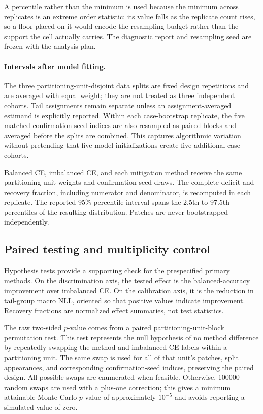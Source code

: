 \documentclass[11pt]{article}
\begin{document}
\noindent A percentile rather than the minimum is used because the minimum across replicates is an extreme order statistic: its value falls as the replicate count rises, so a floor placed on it would encode the resampling budget rather than the support the cell actually carries. The diagnostic report and resampling seed are frozen with the analysis plan.

\paragraph{Intervals after model fitting.}
The three partitioning-unit-disjoint data splits are fixed design repetitions and are averaged with equal weight; they are not treated as three independent cohorts. Tail assignments remain separate unless an assignment-averaged estimand is explicitly reported. Within each case-bootstrap replicate, the five matched confirmation-seed indices are also resampled as paired blocks and averaged before the splits are combined. This captures algorithmic variation without pretending that five model initializations create five additional case cohorts.

Balanced CE, imbalanced CE, and each mitigation method receive the same partitioning-unit weights and confirmation-seed draws. The complete deficit and recovery fraction, including numerator and denominator, is recomputed in each replicate. The reported 95\% percentile interval spans the 2.5th to 97.5th percentiles of the resulting distribution. Patches are never bootstrapped independently.

\subsection{Paired testing and multiplicity control}
\label{app:testing}
Hypothesis tests provide a supporting check for the prespecified primary methods. On the discrimination axis, the tested effect is the balanced-accuracy improvement over imbalanced CE. On the calibration axis, it is the reduction in tail-group macro NLL, oriented so that positive values indicate improvement. Recovery fractions are normalized effect summaries, not test statistics.

The raw two-sided $p$-value comes from a paired partitioning-unit-block permutation test. This test represents the null hypothesis of no method difference by repeatedly swapping the method and imbalanced-CE labels within a partitioning unit. The same swap is used for all of that unit's patches, split appearances, and corresponding confirmation-seed indices, preserving the paired design. All possible swaps are enumerated when feasible. Otherwise, \num{100000} random swaps are used with a plus-one correction; this gives a minimum attainable Monte Carlo $p$-value of approximately $10^{-5}$ and avoids reporting a simulated value of zero.
\end{document}
